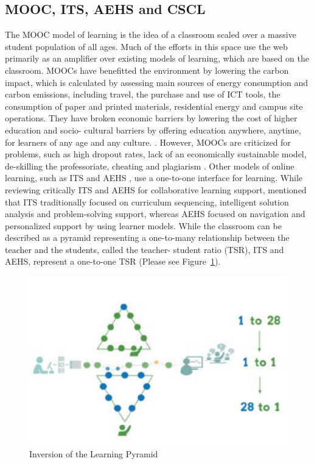 \begin{multicols}{2}
\section{MOOC, ITS, AEHS and CSCL}

The MOOC model of learning is the idea of a classroom scaled over a massive student population of all ages. Much of the efforts in this space use the web primarily as an amplifier over existing models of learning, which are based on the classroom. MOOCs have benefitted the environment by lowering the carbon impact, which is calculated by assessing main sources of energy consumption and carbon emissions, including travel, the purchase and use of ICT tools, the consumption of paper and printed materials, residential energy and campus site operations. They have broken economic barriers by lowering the cost of higher education \cite{art2-key29} and socio- cultural barriers by offering education anywhere, anytime, for learners of any age and any culture. \cite{art2-key25}. However, MOOCs are criticized for problems, such as high dropout rates, lack of an economically sustainable model, de-skilling the professoriate, cheating and plagiarism \cite{art2-key44}. Other models of online learning, such as ITS and AEHS \cite{art2-key05, art2-key10, art2-key18, art2-key39}, use a one-to-one interface for learning. While reviewing critically ITS and AEHS for collaborative learning support, \cite{art2-key35} mentioned that ITS traditionally focused on curriculum sequencing, intelligent solution analysis and problem-solving support, whereas AEHS focused on navigation and personalized support by using learner models. While the classroom can be described as a pyramid representing a one-to-many relationship between the teacher and the students, called the teacher- student ratio (TSR), ITS and AEHS, represent a one-to-one TSR (Please see Figure~\ref{chap2-fig02}).

\begin{figure}[H]
\centering
\includegraphics[scale=1.1]{src/Figures/chap2/chap2-fig02.jpg}
\caption{Inversion of the Learning Pyramid}\label{chap2-fig02}
\end{figure}


\end{multicols}
